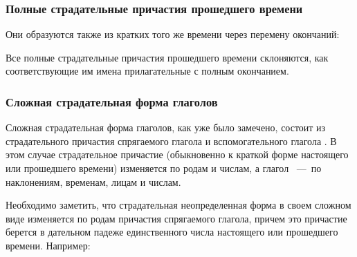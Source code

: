 \documentclass[11pt,a4paper,oneside]{memoir}
\begin{document}
                \subsubsection{Полные страдательные причастия прошедшего времени}

    Они образуются также из кратких того же времени через перемену окончаний:
    
    \bigskip{}

    Все полные страдательные причастия прошедшего времени склоняются, как соответствующие им имена прилагательные с полным окончанием.

                \subsubsection{Сложная страдательная форма глаголов}

    Сложная страдательная форма глаголов, как уже было замечено, состоит из страдательного причастия спрягаемого глагола и вспомогательного глагола {}. В этом случае страдательное причастие (обыкновенно к краткой форме настоящего или прошедшего времени) изменяется по родам и числам, а глагол {}~---~по наклонениям, временам, лицам и числам.
    
    Необходимо заметить, что страдательная неопределенная форма в своем сложном виде изменяется по родам причастия спрягаемого глагола, причем это причастие берется в дательном падеже единственного числа настоящего или прошедшего времени. Например:
    
    \bigskip{}
\end{document}
